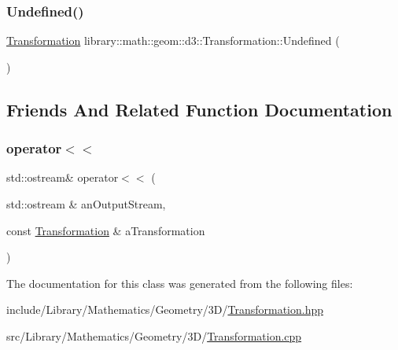 \mbox{\label{classlibrary_1_1math_1_1geom_1_1d3_1_1_transformation_acb7375bde02ed5832d5937908bee7043}} 
\subsubsection{\texorpdfstring{Undefined()}{Undefined()}}
{\footnotesize\ttfamily \hyperlink{classlibrary_1_1math_1_1geom_1_1d3_1_1_transformation}{Transformation} library\+::math\+::geom\+::d3\+::\+Transformation\+::\+Undefined (\begin{DoxyParamCaption}{ }\end{DoxyParamCaption})\hspace{0.3cm}{\ttfamily [static]}}



\subsection{Friends And Related Function Documentation}
\mbox{\label{classlibrary_1_1math_1_1geom_1_1d3_1_1_transformation_afb2829e106dc4aeab1c706d1eaa357e8}} 
\subsubsection{\texorpdfstring{operator$<$$<$}{operator<<}}
{\footnotesize\ttfamily std\+::ostream\& operator$<$$<$ (\begin{DoxyParamCaption}\item[{std\+::ostream \&}]{an\+Output\+Stream,  }\item[{const \hyperlink{classlibrary_1_1math_1_1geom_1_1d3_1_1_transformation}{Transformation} \&}]{a\+Transformation }\end{DoxyParamCaption})\hspace{0.3cm}{\ttfamily [friend]}}



The documentation for this class was generated from the following files\+:\begin{DoxyCompactItemize}
\item 
include/\+Library/\+Mathematics/\+Geometry/3\+D/\hyperlink{3_d_2_transformation_8hpp}{Transformation.\+hpp}\item 
src/\+Library/\+Mathematics/\+Geometry/3\+D/\hyperlink{3_d_2_transformation_8cpp}{Transformation.\+cpp}\end{DoxyCompactItemize}
